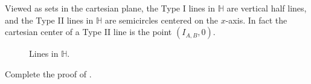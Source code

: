 Viewed as sets in the cartesian plane, the Type I lines in \(\mathbb{H}\) are vertical half lines, and the Type II lines in \(\mathbb{H}\) are semicircles centered on the \(x\)-axis.
In fact the cartesian center of a Type II line is the point \((I_{A,B},0)\).

\begin{figure}[h]
\begin{center}
\caption{\label{fig:lines-in-hyp-half-plane}Lines in \(\mathbb{H}\).}
\end{center}
\end{figure}



\Exercises%

\begin{exercise}
Complete the proof of .
\end{exercise}
